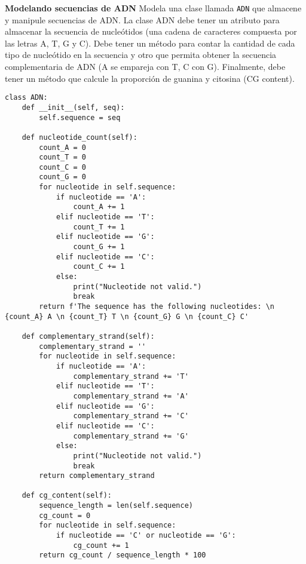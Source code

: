 \documentclass{config/ejercicios}
\begin{document}
\begin{problemS} \textbf{Modelando secuencias de ADN}
Modela una clase llamada \texttt{ADN} que almacene y manipule secuencias de ADN. La clase ADN debe tener un atributo para almacenar la secuencia de nucleótidos (una cadena de caracteres compuesta por las letras A, T, G y C). Debe tener un método para contar la cantidad de cada tipo de nucleótido en la secuencia y otro que permita obtener la secuencia complementaria de ADN (A se empareja con T, C con G). Finalmente, debe tener un método que calcule la proporción de guanina y citosina (CG content).
\begin{lstlisting}
class ADN:
    def __init__(self, seq):
        self.sequence = seq
    
    def nucleotide_count(self):
        count_A = 0
        count_T = 0
        count_C = 0
        count_G = 0
        for nucleotide in self.sequence:
            if nucleotide == 'A':
                count_A += 1
            elif nucleotide == 'T':
                count_T += 1
            elif nucleotide == 'G':
                count_G += 1
            elif nucleotide == 'C':
                count_C += 1
            else:
                print("Nucleotide not valid.")
                break
        return f'The sequence has the following nucleotides: \n {count_A} A \n {count_T} T \n {count_G} G \n {count_C} C'
        
    def complementary_strand(self):
        complementary_strand = ''
        for nucleotide in self.sequence:
            if nucleotide == 'A':
                complementary_strand += 'T'
            elif nucleotide == 'T':
                complementary_strand += 'A'
            elif nucleotide == 'G':
                complementary_strand += 'C'
            elif nucleotide == 'C':
                complementary_strand += 'G'
            else:
                print("Nucleotide not valid.")
                break
        return complementary_strand
    
    def cg_content(self):
        sequence_length = len(self.sequence)
        cg_count = 0
        for nucleotide in self.sequence:
            if nucleotide == 'C' or nucleotide == 'G':
                cg_count += 1
        return cg_count / sequence_length * 100
\end{lstlisting}
\end{problemS}
\end{document}
